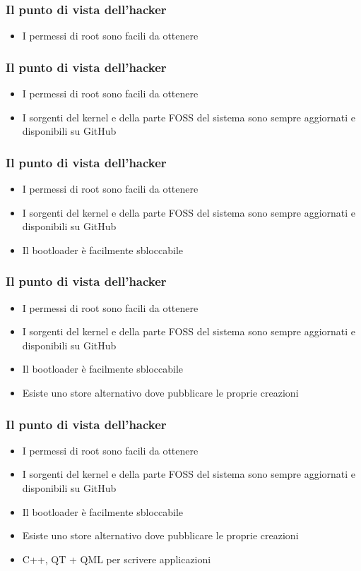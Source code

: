 \documentclass[12pt]{beamer}
\begin{document}
\begin{frame}
	\frametitle{Il punto di vista dell'hacker}
	\begin{itemize}
		\item I permessi di root sono facili da ottenere
	\end{itemize}
\end{frame}

\begin{frame}
	\frametitle{Il punto di vista dell'hacker}
	\begin{itemize}
		\item I permessi di root sono facili da ottenere
		\item I sorgenti del kernel e della parte FOSS del sistema sono sempre aggiornati e disponibili su GitHub
	\end{itemize}
\end{frame}


\begin{frame}
	\frametitle{Il punto di vista dell'hacker}
	\begin{itemize}
		\item I permessi di root sono facili da ottenere
		\item I sorgenti del kernel e della parte FOSS del sistema sono sempre aggiornati e disponibili su GitHub
		\item Il bootloader è facilmente sbloccabile
	\end{itemize}
\end{frame}

\begin{frame}
	\frametitle{Il punto di vista dell'hacker}
	\begin{itemize}
		\item I permessi di root sono facili da ottenere
		\item I sorgenti del kernel e della parte FOSS del sistema sono sempre aggiornati e disponibili su GitHub
		\item Il bootloader è facilmente sbloccabile
		\item Esiste uno store alternativo dove pubblicare le proprie creazioni
	\end{itemize}
\end{frame}

\begin{frame}
	\frametitle{Il punto di vista dell'hacker}
	\begin{itemize}
		\item I permessi di root sono facili da ottenere
		\item I sorgenti del kernel e della parte FOSS del sistema sono sempre aggiornati e disponibili su GitHub
		\item Il bootloader è facilmente sbloccabile
		\item Esiste uno store alternativo dove pubblicare le proprie creazioni
		\item C++, QT + QML per scrivere applicazioni
	\end{itemize}
\end{frame}
\end{document}
